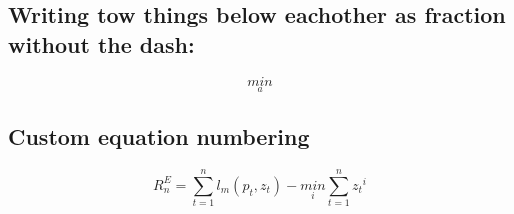 \subsection{Writing tow things below eachother as fraction without the dash:}
\begin{equation}
    \underset{a}{min} 
\end{equation}
\subsection{Custom equation numbering}
\begin{equation}
    R_n^E=\sum_{t=1}^{n}l_m(p_t,z_t)-{\underset{i}{min}} \sum_{t=1}^{n}{z_t}^i
    \tag{-3444asdf234234}
    \label{eq:expert_ragrats}
\end{equation}